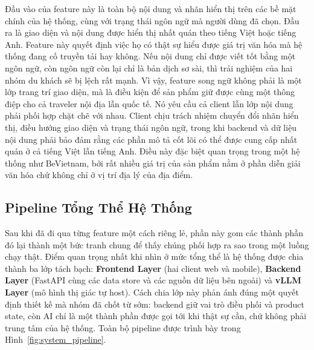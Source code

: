 Đầu vào của feature này là toàn bộ nội dung và nhãn hiển thị trên các bề
mặt chính của hệ thống, cùng với trạng thái ngôn ngữ mà người dùng đã
chọn. Đầu ra là giao diện và nội dung được hiển thị nhất quán theo tiếng
Việt hoặc tiếng Anh. Feature này quyết định việc họ có thật sự hiểu được giá
trị văn hóa mà hệ thống đang cố truyền tải hay không. Nếu nội dung chỉ
được viết tốt bằng một ngôn ngữ, còn ngôn ngữ còn lại chỉ là bản dịch
sơ sài, thì trải nghiệm của hai nhóm du khách sẽ bị lệch rất mạnh. Vì
vậy, feature song ngữ không phải là một lớp trang trí giao diện, mà là
điều kiện để sản phẩm giữ được cùng một thông điệp cho cả traveler nội
địa lẫn quốc tế. Nó yêu cầu cả client lẫn lớp nội dung
phải phối hợp chặt chẽ với nhau. Client chịu trách nhiệm chuyển đổi nhãn hiển thị,
điều hướng giao diện và trạng thái ngôn ngữ, trong khi backend và dữ
liệu nội dung phải bảo đảm rằng các phần mô tả cốt lõi có thể được cung
cấp nhất quán ở cả tiếng Việt lẫn tiếng Anh. Điều này đặc biệt quan
trọng trong một hệ thống như BeVietnam, bởi rất nhiều giá trị của sản
phẩm nằm ở phần diễn giải văn hóa chứ không chỉ ở vị trí địa lý của địa
điểm.

\subsection{Pipeline Tổng Thể Hệ Thống}
\contrib

Sau khi đã đi qua từng feature một cách riêng lẻ, phần này gom các thành
phần đó lại thành một bức tranh chung để thấy chúng phối hợp ra sao trong
một luồng chạy thật. Điểm quan trọng nhất khi nhìn ở mức tổng thể là hệ
thống được chia thành ba lớp tách bạch: \textbf{Frontend Layer} (hai
client web và mobile), \textbf{Backend Layer} (FastAPI cùng các data
store và các nguồn dữ liệu bên ngoài) và \textbf{vLLM Layer} (mô hình thị
giác tự host). Cách chia lớp này phản ánh đúng một quyết định thiết kế mà
nhóm đã chốt từ sớm: backend giữ vai trò điều phối và product state, còn
AI chỉ là một thành phần được gọi tới khi thật sự cần, chứ không phải
trung tâm của hệ thống. Toàn bộ pipeline được trình bày trong
Hình~\ref{fig:system_pipeline}.

